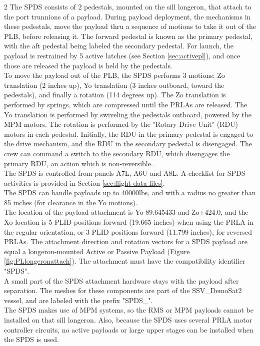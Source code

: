 \documentclass[Space_Shuttle_Vessel_Manual.tex]{subfiles}
\begin{document}
\begin{multicols*}{2}
\noindent
The SPDS consists of 2 pedestals, mounted on the sill longeron, that attach to the port trunnions of a payload. During payload deployment, the mechanisms in these pedestals, move the payload thru a sequence of motions to take it out of the PLB, before releasing it. The forward pedestal is known as the primary pedestal, with the aft pedestal being labeled the secondary pedestal. For launch, the payload is restrained by 5 active latches (see Section \ref{sec:activepl}), and once those are released the payload is held by the pedestals.\\
To move the payload out of the PLB, the SPDS performs 3 motions: Zo translation (2 inches up), Yo translation (3 inches outboard, toward the pedestals), and finally a rotation (114 degrees up). The Zo translation is performed by springs, which are compressed until the PRLAs are released. The Yo translation is performed by swiveling the pedestals outboard, powered by the MPM motors. The rotation is performed by the "Rotary Drive Unit" (RDU) motors in each pedestal. Initially, the RDU in the primary pedestal is engaged to the drive mechanism, and the RDU in the secondary pedestal is disengaged. The crew can command a switch to the secondary RDU, which disengages the primary RDU, an action which is non-reversible.\\
The SPDS is controlled from panels A7L, A6U and A8L. A checklist for SPDS activities is provided in Section \ref{sec:flight-data-files}.\\
The SPDS can handle payloads up to 40000lbs, and with a radius no greater than 85 inches (for clearance in the Yo motions).\\
The location of the payload attachment is Yo-89.645433 and Zo+424.0, and the Xo location is 5 PLID positions forward (19.665 inches) when using the PRLA in the regular orientation, or 3 PLID positions forward (11.799 inches), for reversed PRLAs. The attachment direction and rotation vectors for a SPDS payload are equal a longeron-mounted Active or Passive Payload (Figure \ref{fig:PLlongeronattach}). The attachment must have the compatibility identifier "SPDS".\\
A small part of the SPDS attachment hardware stays with the payload after separation. The meshes for these components are part of the SSV\_DemoSat2 vessel, and are labeled with the prefix "SPDS\_".\\
The SPDS makes use of MPM systems, so the RMS or MPM payloads cannot be installed on that sill longeron. Also, because the SPDS uses several PRLA motor controller circuits, no active payloads or large upper stages can be installed when the SPDS is used.
\newpage



\end{multicols*}
\end{document}

